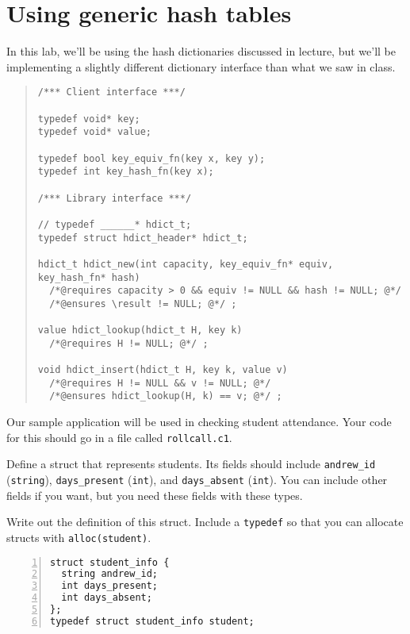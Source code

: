 \section*{Using generic hash tables}

In this lab, we'll be using the hash dictionaries discussed in
lecture, but we'll be implementing a slightly different
dictionary interface than what we saw in class.
\begin{quote}
\begin{lstlisting}
/*** Client interface ***/

typedef void* key;
typedef void* value;

typedef bool key_equiv_fn(key x, key y);
typedef int key_hash_fn(key x);

/*** Library interface ***/

// typedef ______* hdict_t;
typedef struct hdict_header* hdict_t;

hdict_t hdict_new(int capacity, key_equiv_fn* equiv, key_hash_fn* hash)
  /*@requires capacity > 0 && equiv != NULL && hash != NULL; @*/
  /*@ensures \result != NULL; @*/ ;

value hdict_lookup(hdict_t H, key k)
  /*@requires H != NULL; @*/ ;

void hdict_insert(hdict_t H, key k, value v)
  /*@requires H != NULL && v != NULL; @*/
  /*@ensures hdict_lookup(H, k) == v; @*/ ;
\end{lstlisting}
\end{quote}
Our sample application will be used in checking student attendance.
Your code for this should go in a file called \lstinline'rollcall.c1'. %

\begin{part}
  Define a struct that represents students.  Its fields should include
  \lstinline'andrew_id' (\lstinline'string'), \lstinline'days_present'
  (\lstinline'int'), and \lstinline'days_absent' (\lstinline'int').
  You can include other fields if you want, but you need these fields
  with these types.

  Write out the definition of this struct.  Include a
  \lstinline'typedef' so that you can allocate structs with
  \lstinline'alloc(student)'.

\onePT
\begin{solution}
\begin{lstlisting}[numbers=left, name="rollcall"]
struct student_info {
  string andrew_id;
  int days_present;
  int days_absent;
};
typedef struct student_info student;

\end{lstlisting}
\end{solution}
\end{part}

